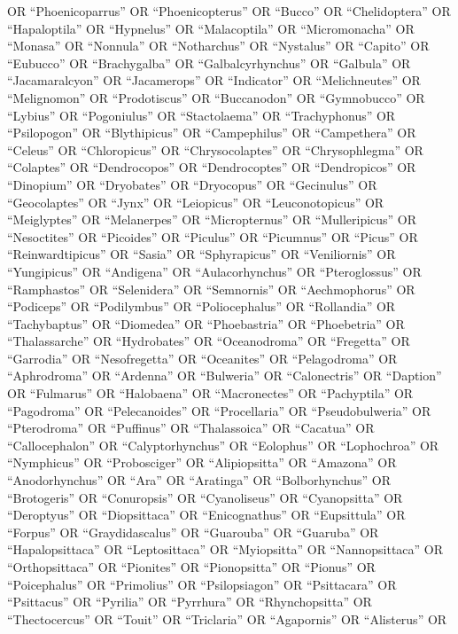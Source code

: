 \documentclass[
  number,
  review,
  onecolumn]{elsarticle}
\begin{document}
OR ``Phoenicoparrus'' OR ``Phoenicopterus'' OR ``Bucco'' OR
``Chelidoptera'' OR ``Hapaloptila'' OR ``Hypnelus'' OR ``Malacoptila''
OR ``Micromonacha'' OR ``Monasa'' OR ``Nonnula'' OR ``Notharchus'' OR
``Nystalus'' OR ``Capito'' OR ``Eubucco'' OR ``Brachygalba'' OR
``Galbalcyrhynchus'' OR ``Galbula'' OR ``Jacamaralcyon'' OR
``Jacamerops'' OR ``Indicator'' OR ``Melichneutes'' OR ``Melignomon'' OR
``Prodotiscus'' OR ``Buccanodon'' OR ``Gymnobucco'' OR ``Lybius'' OR
``Pogoniulus'' OR ``Stactolaema'' OR ``Trachyphonus'' OR ``Psilopogon''
OR ``Blythipicus'' OR ``Campephilus'' OR ``Campethera'' OR ``Celeus'' OR
``Chloropicus'' OR ``Chrysocolaptes'' OR ``Chrysophlegma'' OR
``Colaptes'' OR ``Dendrocopos'' OR ``Dendrocoptes'' OR ``Dendropicos''
OR ``Dinopium'' OR ``Dryobates'' OR ``Dryocopus'' OR ``Gecinulus'' OR
``Geocolaptes'' OR ``Jynx'' OR ``Leiopicus'' OR ``Leuconotopicus'' OR
``Meiglyptes'' OR ``Melanerpes'' OR ``Micropternus'' OR ``Mulleripicus''
OR ``Nesoctites'' OR ``Picoides'' OR ``Piculus'' OR ``Picumnus'' OR
``Picus'' OR ``Reinwardtipicus'' OR ``Sasia'' OR ``Sphyrapicus'' OR
``Veniliornis'' OR ``Yungipicus'' OR ``Andigena'' OR ``Aulacorhynchus''
OR ``Pteroglossus'' OR ``Ramphastos'' OR ``Selenidera'' OR ``Semnornis''
OR ``Aechmophorus'' OR ``Podiceps'' OR ``Podilymbus'' OR
``Poliocephalus'' OR ``Rollandia'' OR ``Tachybaptus'' OR ``Diomedea'' OR
``Phoebastria'' OR ``Phoebetria'' OR ``Thalassarche'' OR ``Hydrobates''
OR ``Oceanodroma'' OR ``Fregetta'' OR ``Garrodia'' OR ``Nesofregetta''
OR ``Oceanites'' OR ``Pelagodroma'' OR ``Aphrodroma'' OR ``Ardenna'' OR
``Bulweria'' OR ``Calonectris'' OR ``Daption'' OR ``Fulmarus'' OR
``Halobaena'' OR ``Macronectes'' OR ``Pachyptila'' OR ``Pagodroma'' OR
``Pelecanoides'' OR ``Procellaria'' OR ``Pseudobulweria'' OR
``Pterodroma'' OR ``Puffinus'' OR ``Thalassoica'' OR ``Cacatua'' OR
``Callocephalon'' OR ``Calyptorhynchus'' OR ``Eolophus'' OR
``Lophochroa'' OR ``Nymphicus'' OR ``Probosciger'' OR ``Alipiopsitta''
OR ``Amazona'' OR ``Anodorhynchus'' OR ``Ara'' OR ``Aratinga'' OR
``Bolborhynchus'' OR ``Brotogeris'' OR ``Conuropsis'' OR ``Cyanoliseus''
OR ``Cyanopsitta'' OR ``Deroptyus'' OR ``Diopsittaca'' OR
``Enicognathus'' OR ``Eupsittula'' OR ``Forpus'' OR ``Graydidascalus''
OR ``Guarouba'' OR ``Guaruba'' OR ``Hapalopsittaca'' OR ``Leptosittaca''
OR ``Myiopsitta'' OR ``Nannopsittaca'' OR ``Orthopsittaca'' OR
``Pionites'' OR ``Pionopsitta'' OR ``Pionus'' OR ``Poicephalus'' OR
``Primolius'' OR ``Psilopsiagon'' OR ``Psittacara'' OR ``Psittacus'' OR
``Pyrilia'' OR ``Pyrrhura'' OR ``Rhynchopsitta'' OR ``Thectocercus'' OR
``Touit'' OR ``Triclaria'' OR ``Agapornis'' OR ``Alisterus'' OR
\end{document}
